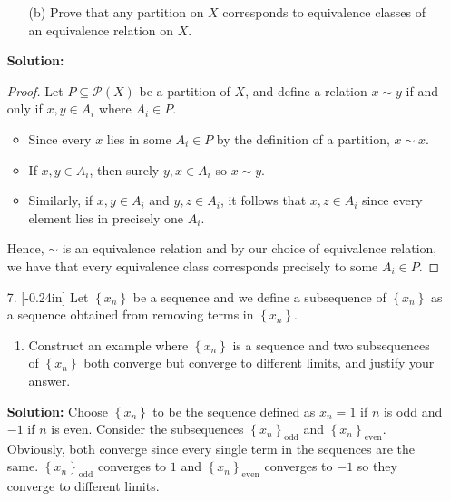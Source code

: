 \documentclass[letterpaper,12pt]{article}
\newcommand{\set}[1]{\left\{ #1 \right\}}
\theoremstyle{definition}
\begin{document}
\pagebreak
\begin{enumerate}
    \item[] \begin{enumerate}
        \item[(b)] Prove that any partition on $X$ corresponds to equivalence classes of an equivalence relation on $X$.
    \end{enumerate}
     \begin{mdframed}
            \textbf{Solution:}
            \begin{proof}
                Let $P \subseteq \mathcal{P}(X)$ be a partition of $X$, and define a relation $x \sim y$ if and only if $x,y \in A_i$ where $A_i \in P$. \begin{itemize}
                    \item Since every $x$ lies in some $A_i \in P$ by the definition of a partition, $x \sim x$.
                    \item If $x, y \in A_i$, then surely $y,x \in A_i$ so $x \sim y$.
                    \item Similarly, if $x ,y \in A_i$ and $y,z \in A_i$, it follows that $x , z \in A_i$ since every element lies in precisely one $A_i$.
                \end{itemize}
                Hence, $\sim$ is an equivalence relation and by our choice of equivalence relation, we have that every equivalence class corresponds precisely to some $A_i \in P$.
            \end{proof}
        \end{mdframed}
\end{enumerate}
\pagebreak
\begin{enumerate}
    \item[7.] 
     \reversemarginpar{}[-0.24in] Let $\set{x_n}$ be a sequence and we define a subsequence of $\set{x_n}$ as a sequence obtained from removing terms in $\set{x_n}$. \begin{enumerate}
         \item Construct an example where $\set{x_n}$ is a sequence and two subsequences of $\set{x_n}$ both converge but converge to different limits, and justify your answer.
     \end{enumerate}
     \begin{mdframed}
         \textbf{Solution:} Choose $\set{x_n}$ to be the sequence defined as $x_n = 1$ if $n$ is odd and $-1$ if $n$ is even. Consider the subsequences $\set{x_n}_\mathrm{odd}$ and $\set{x_n}_\mathrm{even}$. Obviously, both converge since every single term in the sequences are the same. $\set{x_n}_\mathrm{odd}$ converges to $1$ and $\set{x_n}_\mathrm{even}$ converges to $-1$ so they converge to different limits.
     \end{mdframed}
    \end{enumerate}
\end{document}
